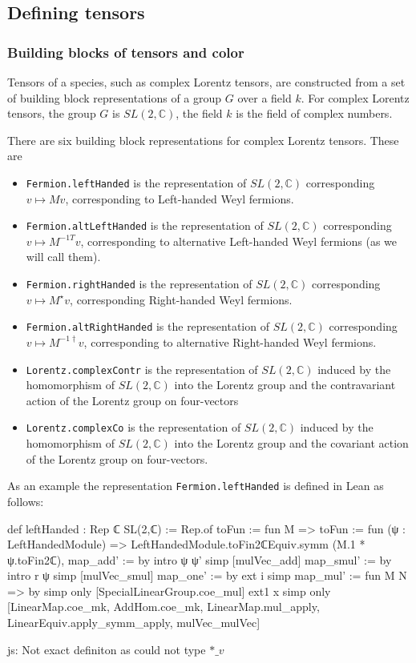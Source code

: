 \documentclass[a4paper, 11pt]{article}
\newcommand{\js}[1]{ {\color{magenta} js:  #1}}
\begin{document}
\subsection{Defining tensors}

\subsubsection{Building blocks of tensors and color}

Tensors of a species, such as complex Lorentz tensors, are constructed from a 
set of building block representations of a group $G$ over a field $k$.
For complex Lorentz tensors, the group $G$ is $SL(2, \mathbb{C})$, the field $k$ is the 
field of complex numbers. 

There are six building block representations for complex Lorentz tensors. These are
\begin{itemize}
  \item \lstinline|Fermion.leftHanded| is the
   representation of $SL(2, \mathbb{C})$ corresponding 
      $v \mapsto M v$, corresponding to Left-handed Weyl fermions.
  \item \lstinline|Fermion.altLeftHanded| is the
  representation of $SL(2, \mathbb{C})$ corresponding 
     $v \mapsto M^{-1 T} v$, corresponding to alternative Left-handed Weyl fermions (as we will 
     call them).
  \item \lstinline|Fermion.rightHanded| is the representation of $SL(2, \mathbb{C})$ corresponding 
  $v \mapsto M^\star v$, corresponding Right-handed Weyl fermions.
  \item \lstinline|Fermion.altRightHanded| is the representation of $SL(2, \mathbb{C})$ corresponding
  $v \mapsto M^{-1 \dagger} v$, corresponding to alternative Right-handed Weyl fermions.
  \item \lstinline|Lorentz.complexContr| is the representation of $SL(2, \mathbb{C})$ 
   induced by the homomorphism of $SL(2, \mathbb{C})$ into the Lorentz group and the contravariant 
   action of the Lorentz group on four-vectors
  \item \lstinline|Lorentz.complexCo| is the representation of $SL(2, \mathbb{C})$
    induced by the homomorphism of $SL(2, \mathbb{C})$ into the Lorentz group and the covariant
    action of the Lorentz group on four-vectors.
\end{itemize}
As an example the representation \lstinline|Fermion.leftHanded| is defined in Lean as follows:
\begin{code}
def leftHanded : Rep ℂ SL(2,ℂ) := Rep.of {
    toFun := fun M => {
      toFun := fun (ψ : LeftHandedModule) =>
        LeftHandedModule.toFin2ℂEquiv.symm (M.1 * ψ.toFin2ℂ),
      map_add' := by
        intro ψ ψ'
        simp [mulVec_add]
      map_smul' := by
        intro r ψ
        simp [mulVec_smul]}
    map_one' := by
      ext i
      simp
    map_mul' := fun M N => by
      simp only [SpecialLinearGroup.coe_mul]
      ext1 x
      simp only [LinearMap.coe_mk, AddHom.coe_mk, LinearMap.mul_apply, LinearEquiv.apply_symm_apply,
        mulVec_mulVec]}  
\end{code} \js{Not exact definiton as could not type $*\_v$}
\end{document}
